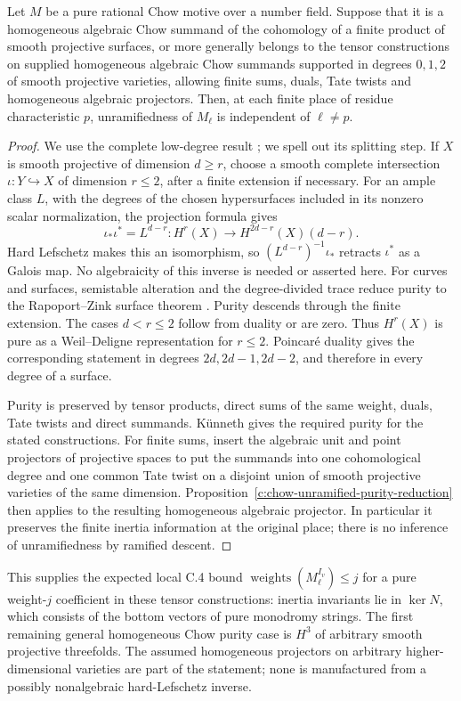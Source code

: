 \begin{corollary}
\label{c:surface-lowdegree-chow-unramified}
Let $M$ be a pure rational Chow motive over a number field.  Suppose
that it is a homogeneous algebraic Chow summand of the cohomology of
a finite product of smooth projective surfaces, or more generally
belongs to the tensor constructions on supplied homogeneous algebraic
Chow summands supported in degrees $0,1,2$ of smooth projective
varieties, allowing finite sums, duals, Tate twists and homogeneous
algebraic projectors.  Then, at each finite place of residue
characteristic $p$, unramifiedness of $M_\ell$ is independent of
$\ell\ne p$.
\end{corollary}
\begin{proof}
We use the complete low-degree result
\citep[Lemma~3.9, author p.~42]{c_saito2003weights}; we spell out its
splitting step.  If $X$ is smooth projective of dimension $d\ge r$,
choose a smooth complete intersection $\iota:Y\hookrightarrow X$ of
dimension $r\le2$, after a finite extension if necessary.  For an ample
class $L$, with the degrees of the chosen hypersurfaces included in
its nonzero scalar normalization, the projection formula gives
\[
 \iota_*\iota^*=L^{d-r}:
 H^r(X)\longrightarrow H^{2d-r}(X)(d-r).
\]
Hard Lefschetz makes this an isomorphism, so
$(L^{d-r})^{-1}\iota_*$ retracts $\iota^*$ as a Galois map.  No
algebraicity of this inverse is needed or asserted here.  For curves
and surfaces, semistable alteration and the degree-divided trace
reduce purity to the Rapoport--Zink surface theorem
\citep[Satz~2.13]{c_rapoportzink1982}.  Purity descends through the
finite extension.  The cases $d<r\le2$ follow from duality or are zero.
Thus $H^r(X)$ is pure as a Weil--Deligne representation for $r\le2$.
Poincar\'e duality gives the corresponding statement in degrees
$2d,2d-1,2d-2$, and therefore in every degree of a surface.

Purity is preserved by tensor products, direct sums of the same
weight, duals, Tate twists and direct summands.  K\"unneth gives the
required purity for the stated constructions.  For finite sums, insert
the algebraic unit and point projectors of projective spaces to put
the summands into one cohomological degree and one common Tate twist
on a disjoint union of smooth projective varieties of the same
dimension.  Proposition~\ref{c:chow-unramified-purity-reduction}
then applies to the resulting homogeneous algebraic projector.  In particular it preserves the
finite inertia information at the original place; there is no
inference of unramifiedness by ramified descent.
\end{proof}

This supplies the expected local C.4 bound
$\operatorname{weights}(M_\ell^{I_v})\le j$ for a pure weight-$j$
coefficient in these tensor constructions: inertia invariants lie
in $\ker N$, which consists of the bottom vectors of pure monodromy
strings.  The first remaining general homogeneous Chow purity case
is $H^3$ of arbitrary smooth projective threefolds.  The assumed
homogeneous projectors on arbitrary higher-dimensional varieties
are part of the statement; none is manufactured from a possibly
nonalgebraic hard-Lefschetz inverse.
